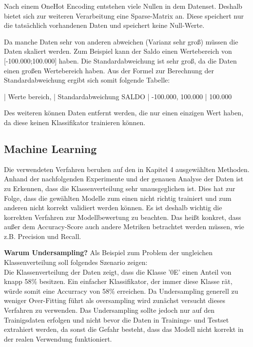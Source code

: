 Nach einem OneHot Encoding entstehen viele Nullen in dem Datenset.
Deshalb bietet sich zur weiteren Verarbeitung eine Sparse-Matrix an.
Diese speichert nur die tatsächlich vorhandenen Daten und speichert keine Null-Werte. %

Da manche Daten sehr von anderen abweichen (Varianz sehr groß) müssen die Daten skaliert werden.
Zum Beispiel kann der Saldo einen Wertebereich von [-100.000;100.000] haben.
Die Standardabweichung ist sehr groß, da die Daten einen großen Wertebereich haben.
Aus der Formel zur Berechnung der Standardabweichung ergibt sich somit folgende Tabelle:

      | Werte bereich,      | Standardabweichung
SALDO | -100.000, 100.000   | 100.000


Des weiteren können Daten entfernt werden, die nur einen einzigen Wert haben, da diese keinen Klassifikator trainieren können.



\subsection{Machine Learning}
\label{sub:machine_learning}
Die verwendeten Verfahren beruhen auf den in Kapitel 4 ausgewählten Methoden.
Anhand der nachfolgenden Experimente und der genauen Analyse der Daten ist zu Erkennen, dass die Klassenverteilung sehr unausgeglichen ist. 
Dies hat zur Folge, dass die gewählten Modelle zum einen nicht richtig trainiert und zum anderen nicht korrekt validiert werden können. 
Es ist deshalb wichtig die korrekten Verfahren zur Modellbewertung zu beachten.
Das heißt konkret, dass außer dem Accuracy-Score auch andere Metriken betrachtet werden müssen, wie z.B. Precision und Recall.


\textbf{Warum Undersampling?}
Als Beispiel zum Problem der ungleichen Klassenverteilung soll folgendes Szenario zeigen: \\
Die Klassenverteilung der Daten zeigt, dass die Klasse '0E' einen Anteil von knapp 58\% besitzen. 
Ein einfacher Klassifikator, der immer diese Klasse rät, würde somit eine Accurracy von 58\% erreichen. %
Da Undersampling generell zu weniger Over-Fitting führt als oversampling wird zunächst versucht dieses Verfahren zu verwenden. \cite{fundamentals of ml}
Das Undersampling sollte jedoch nur auf den Trainigsdaten erfolgen und nicht bevor die Daten in Trainings- und Testset extrahiert werden, da sonst die Gefahr besteht, dass das Modell nicht korrekt in der realen Verwendung funktioniert. 

